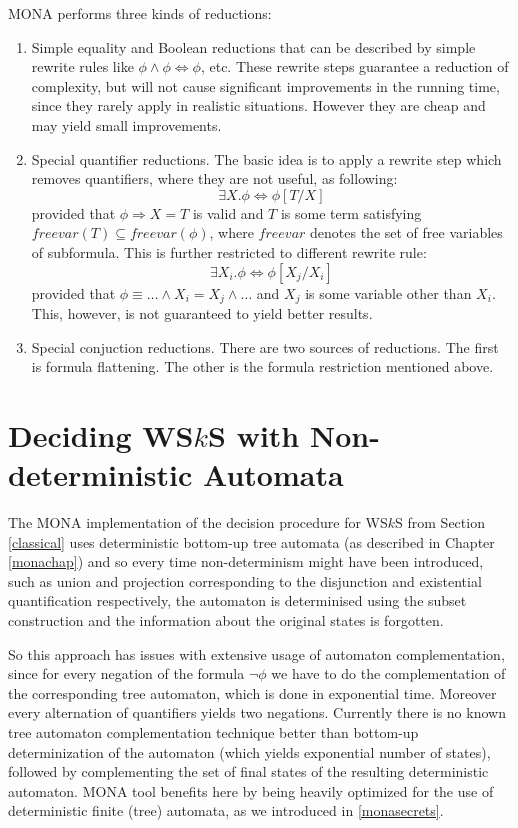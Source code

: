 MONA performs three kinds of reductions:
\begin{enumerate}
 \item Simple equality and Boolean reductions that can be described by simple rewrite rules like $\phi \wedge \phi \Leftrightarrow \phi$, etc. These rewrite steps guarantee a reduction of complexity, but will not cause significant improvements in the running time, since they rarely apply in realistic situations. However they are cheap and may yield small improvements.

\item Special quantifier reductions. The basic idea is to apply a rewrite step which removes quantifiers, where they are not useful, as following: $$\exists X . \phi \Leftrightarrow \phi[T/X]$$ provided that $\phi \Rightarrow X = T$ is valid and $T$ is some term satisfying $freevar(T) \subseteq freevar(\phi)$, where $freevar$ denotes the set of free variables of subformula. This is further restricted to different rewrite rule: $$ \exists X_i . \phi \Leftrightarrow \phi[X_j/X_i]$$ provided that $\phi \equiv \ldots \wedge X_i = X_j \wedge \ldots$ and $X_j$ is some variable other than $X_i$. This, however, is not guaranteed to yield better results.

\item Special conjuction reductions. There are two sources of reductions. The first is formula flattening. The other is  the formula restriction mentioned above.
\end{enumerate}

 \chapter{Deciding WS$k$S with Non-deterministic Automata}\label{our}

The \textsc{MONA} implementation of the decision procedure for WS$k$S from Section \ref{classical} uses deterministic bottom-up tree automata (as described in Chapter \ref{monachap}) and so every time non-determinism might have been introduced, such as union and projection corresponding to the disjunction and existential quantification respectively, the automaton is determinised using the subset construction and the information about the original states is forgotten.

So this approach has issues with extensive usage of automaton complementation, since for every negation of the formula $\neg\phi$ we have to do the complementation of the corresponding tree automaton, which is done in exponential time. Moreover every alternation of quantifiers yields two negations. Currently there is no known tree automaton complementation technique better than bottom-up determinization of the automaton (which yields exponential number of states), followed by complementing the set of final states of the resulting deterministic automaton. MONA tool benefits here by being heavily optimized for the use of deterministic finite (tree) automata, as we introduced in \ref{monasecrets}.

